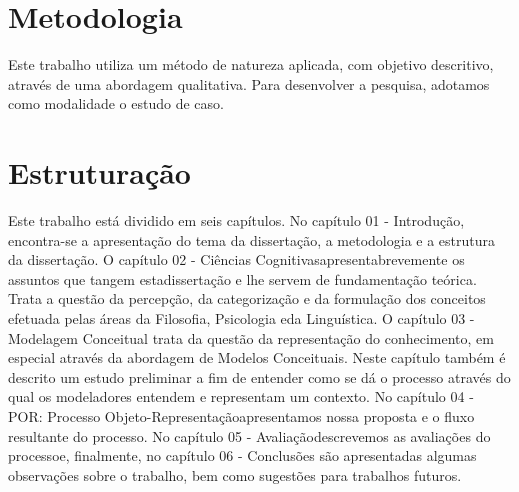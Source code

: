 \section{\hspace*{3pt} Metodologia}

Este trabalho utiliza um método de natureza aplicada, com objetivo descritivo, através de uma abordagem qualitativa. Para desenvolver a pesquisa, adotamos como modalidade o estudo de caso.

\section{\hspace*{3pt} Estruturação}

Este trabalho está dividido em seis capítulos. No capítulo 01 - Introdução, encontra-se a apresentação do tema da dissertação, a metodologia e a estrutura da dissertação. O capítulo 02 - Ciências Cognitivasapresentabrevemente os assuntos que tangem estadissertação e lhe servem de fundamentação teórica. Trata a questão da percepção, da categorização e da formulação dos conceitos efetuada pelas áreas da Filosofia, Psicologia eda Linguística. O capítulo 03 - Modelagem Conceitual trata da questão da representação do conhecimento, em especial através da abordagem de Modelos Conceituais. Neste capítulo também é descrito um estudo preliminar a fim de entender como se dá o processo através do qual os modeladores entendem e representam um contexto. No capítulo 04 - POR: Processo Objeto-Representaçãoapresentamos nossa proposta e o fluxo resultante do processo. No capítulo 05 - Avaliaçãodescrevemos as avaliações do processoe, finalmente, no capítulo 06 - Conclusões são apresentadas algumas observações sobre o trabalho, bem como sugestões para trabalhos futuros.